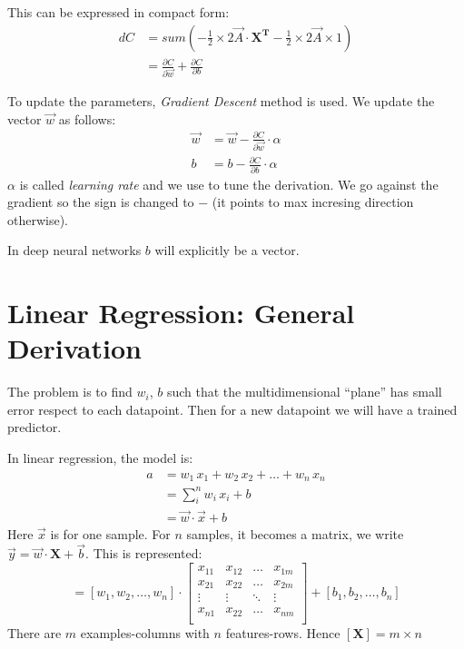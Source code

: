 This can be expressed in compact form:
\begin{align}
  dC &= sum(-\frac{1}{2}\times{}2\vec{A}\cdot{}\mathbf{X^T} -\frac{1}{2}\times{}2\vec{A}\times{}1)\\
  &= \frac{\partial C}{\partial \vec{w}} + \frac{\partial C}{\partial b}  \nonumber
\end{align}

To update the parameters, \textit{Gradient Descent} method is used. We update the vector $\vec{w}$ as follows:
\begin{align}
  \vec{w} &= \vec{w} -\frac{\partial C}{\partial \vec{w}}\cdot{}\alpha\\
  b &= b -\frac{\partial C}{\partial b}\cdot{}\alpha
\end{align}
$\alpha$ is called \textit{learning rate} and we use to tune the derivation. We go against the gradient so the sign is changed to $-$ (it points to max incresing direction otherwise).

In deep neural networks $b$ will explicitly be a vector.




\section{Linear Regression: General Derivation}
The problem is to find $w_i$, $b$ such that the multidimensional ``plane'' has small error respect to each datapoint. Then for a new datapoint we will have a trained predictor.

In linear regression, the model is:
\begin{align*}
 a &= w_1\, x_1 + w_2\, x_2 +\ldots+ w_n\, x_n\\
   &= \sum_i^n w_i\, x_i + b \\
   &= \vec{w}\cdot\vec{x} + b
\end{align*}
Here $\vec{x}$ is for one sample. For $n$ samples, it becomes a matrix, we write $\vec{y} = \vec{w}\cdot\mathbf{X} + \vec{b}$. This is represented:
\begin{equation*}
  [a_1, a_2, \ldots, a_n] = 
  [w_1, w_2, \ldots, w_n] \cdot
  \begin{bmatrix}
    x_{11} & x_{12} & \ldots & x_{1m}\\
    x_{21} & x_{22} & \ldots & x_{2m}\\
    \vdots & \vdots & \ddots & \vdots\\
    x_{n1} & x_{22} & \ldots & x_{nm}\\
  \end{bmatrix}
  + [b_1, b_2, \ldots, b_n]
\end{equation*}
There are $m$ examples-columns with $n$ features-rows. Hence $[\mathbf{X}] = m\times{}n$

